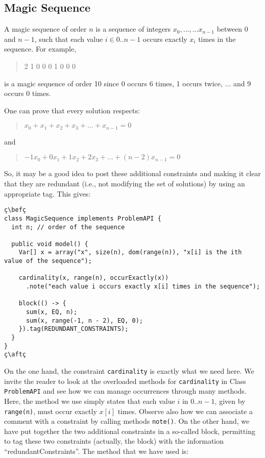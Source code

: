 \documentclass[10pt]{article}
\newcommand{\gb}[1]{{\tt #1}} %
\newcommand{\nn}[1]{{\tt #1}} %
\newenvironment{myvb}{\endgraf\small\verbatim}{\endverbatim}
\def\bef{\rule{10cm}{0.1mm}} %
\def\aft{\rule{10cm}{0.1mm}\medskip}
\begin{document}
\subsection{Magic Sequence}

A magic sequence of order $n$ is a sequence of integers $x_0,\dots,…x_{n-1}$ between 0 and $n-1$, such that each value $i \in 0..n−1$ occurs exactly $x_i$ times in the sequence.
For example,
\begin{quote}
\begin{myvb}
  6 2 1 0 0 0 1 0 0 0
\end{myvb}
\end{quote}
is a magic sequence of order 10 since 0 occurs 6 times, 1 occurs twice, $\dots$ and 9 occurs 0 times.

One can prove that every solution respects:
\begin{quote}
  $x_0 + x_1 + x_2 + x_3 + \dots + x_{n-1} = 0$
\end{quote}
and
\begin{quote}
  $-1x_0 + 0x_1 + 1x_2 + 2x_3 + \dots + (n-2)x_{n-1} = 0$
\end{quote}

So, it may be a good idea to post these additional constraints  and making it clear that they are redundant (i.e., not modifying the set of solutions) by using an appropriate tag.
This gives:

\begin{lstlisting}
ç\befç
class MagicSequence implements ProblemAPI {
  int n; // order of the sequence

  public void model() {
    Var[] x = array("x", size(n), dom(range(n)), "x[i] is the ith value of the sequence");
    
    cardinality(x, range(n), occurExactly(x))
      .note("each value i occurs exactly x[i] times in the sequence");

    block(() -> {
      sum(x, EQ, n);
      sum(x, range(-1, n - 2), EQ, 0);
    }).tag(REDUNDANT_CONSTRAINTS);
  }
}
ç\aftç
\end{lstlisting}

On the one hand, the constraint \gb{cardinality} is exactly what we need here.
We invite the reader to look at the overloaded methods for \gb{cardinality} in Class \nn{ProblemAPI} and see how we can manage occurrences through many methods.
Here, the method we use simply states that each value $i$ in $0..n-1$, given by \verb!range(n)!, must occur exactly $x[i]$ times.
Observe also how we can associate a comment with a constraint by calling methods \nn{note()}.
On the other hand, we have put together the two additional constraints in a so-called block, permitting to tag these two constraints (actually, the block) with the information ``redundantConstraints''.
The method that we have used is:
\end{document}
